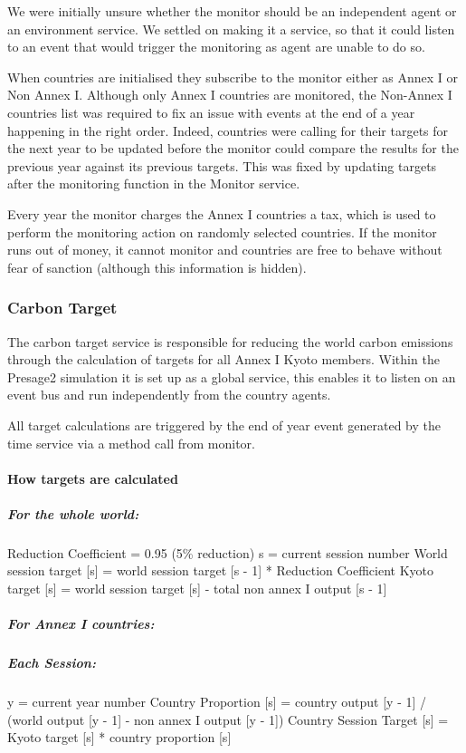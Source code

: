 We were initially unsure whether the monitor should be an independent agent or an environment service. We settled on making it a service, so that it could listen to an event that would trigger the monitoring as agent are unable to do so.

When countries are initialised they subscribe to the monitor either as Annex I or Non Annex I. Although only Annex I countries are monitored, the Non-Annex I countries list was required to fix an issue with events at the end of a year happening in the right order. Indeed, countries were calling for their targets for the next year to be updated before the monitor could compare the results for the previous year against its previous targets. This was fixed by updating targets after the monitoring function in the Monitor service.

Every year the monitor charges the Annex I countries a tax, which is used to perform the monitoring action on randomly selected countries. If the monitor runs out of money, it cannot monitor and countries are free to behave without fear of sanction (although this information is hidden).

\subsubsection{Carbon Target}

The carbon target service is responsible for reducing the world carbon emissions through the calculation of targets for all Annex I Kyoto members. Within the Presage2 simulation it is set up as a global service, this enables it to listen on an event bus and run independently from the country agents.
 
All target calculations are triggered by the end of year event generated by the time service via a method call from monitor.

\paragraph{How targets are calculated}
\subparagraph{For the whole world:}
Reduction Coefficient = 0.95 (5\% reduction)
s = current session number
World session target [s] = world session target [s - 1] * Reduction Coefficient
Kyoto target [s] = world session target [s] - total non annex I output [s - 1]

\subparagraph{For Annex I countries:}
\subparagraph{Each Session:}
y = current year number
Country Proportion [s] = country output [y - 1] / (world output [y - 1] - non annex I output [y - 1])
Country Session Target [s] = Kyoto target [s] * country proportion [s]
 
